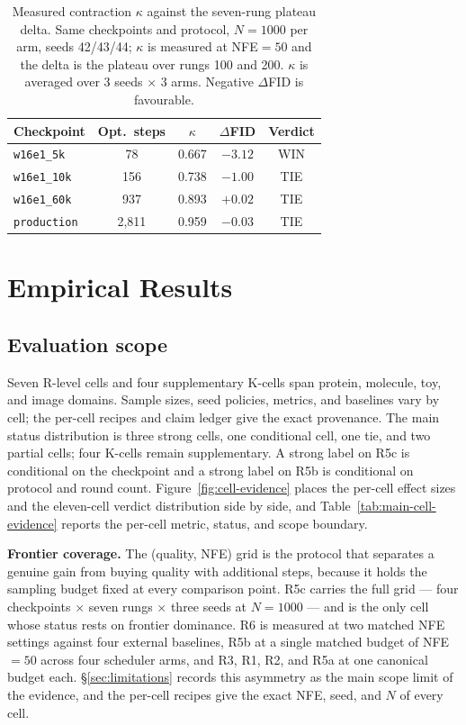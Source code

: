\documentclass[journal,twocolumn,final]{IEEEtran}
\begin{document}
\begin{table}[t]
\centering\small
\caption{Measured contraction $\kappa$ against the seven-rung plateau delta. Same checkpoints and protocol, $N=1000$ per arm, seeds 42/43/44; $\kappa$ is measured at NFE$=50$ and the delta is the plateau over rungs 100 and 200. $\kappa$ is averaged over 3 seeds $\times$ 3 arms. Negative $\Delta$FID is favourable.}
\label{tab:kappa-gate}
\begin{tabular}{lcccc}
\toprule
Checkpoint & Opt.\ steps & $\kappa$ & $\Delta$FID & Verdict \\
\midrule
\texttt{w16e1\_5k} & 78 & 0.667 & $-3.12$ & WIN \\
\texttt{w16e1\_10k} & 156 & 0.738 & $-1.00$ & TIE \\
\texttt{w16e1\_60k} & 937 & 0.893 & $+0.02$ & TIE \\
\texttt{production} & 2,811 & 0.959 & $-0.03$ & TIE \\
\bottomrule
\end{tabular}
\end{table}

\section{Empirical Results}
\label{sec:results}

\subsection{Evaluation scope}
Seven R-level cells and four supplementary K-cells span protein, molecule, toy, and image domains. Sample sizes, seed policies, metrics, and baselines vary by cell; the per-cell recipes and claim ledger give the exact provenance. The main status distribution is three strong cells, one conditional cell, one tie, and two partial cells; four K-cells remain supplementary. A strong label on R5c is conditional on the checkpoint and a strong label on R5b is conditional on protocol and round count. Figure~\ref{fig:cell-evidence} places the per-cell effect sizes and the eleven-cell verdict distribution side by side, and Table~\ref{tab:main-cell-evidence} reports the per-cell metric, status, and scope boundary.

\textbf{Frontier coverage.} The (quality, NFE) grid is the protocol that separates a genuine gain from buying quality with additional steps, because it holds the sampling budget fixed at every comparison point. R5c carries the full grid --- four checkpoints $\times$ seven rungs $\times$ three seeds at $N=1000$ --- and is the only cell whose status rests on frontier dominance. R6 is measured at two matched NFE settings against four external baselines, R5b at a single matched budget of NFE$=50$ across four scheduler arms, and R3, R1, R2, and R5a at one canonical budget each. \S\ref{sec:limitations} records this asymmetry as the main scope limit of the evidence, and the per-cell recipes give the exact NFE, seed, and $N$ of every cell.
\end{document}
